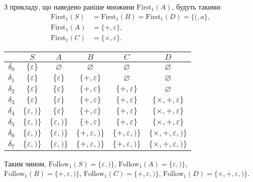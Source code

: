 З прикладу, що наведено раніше множини $\text{First}_1(A)$, будуть такими:
\begin{align*}
\text{First}_1 (S) &= \text{First}_1 (B) = \text{First}_1 (D) = \{(, a\}, \\
\text{First}_1 (A) &= \{+, \varepsilon\}, \\
\text{First}_1 (C) &= \{\times, \varepsilon\}.
\end{align*}

\begin{table}[H]
	\centering
	\begin{tabular}{|c|c|c|c|c|c|}
		\hline
		& $S$ & $A$ & $B$ & $C$ & $D$ \\ \hline
		$\delta_0$ & $\{\varepsilon\}$ & $\varnothing$ & $\varnothing$ & $\varnothing$ & $\varnothing$ \\ \hline
		$\delta_1$ & $\{\varepsilon\}$ & $\{\varepsilon\}$ & $\{+,\varepsilon\}$ & $\varnothing$ & $\varnothing$ \\ \hline
		$\delta_2$ & $\{\varepsilon\}$ & $\{\varepsilon\}$ & $\{+,\varepsilon\}$ & $\{+,\varepsilon\}$ & $\varnothing$ \\ \hline
		$\delta_3$ & $\{\varepsilon\}$ & $\{\varepsilon\}$ & $\{+,\varepsilon\}$ & $\{+,\varepsilon\}$ & $\{\times,+,\varepsilon\}$ \\ \hline
		$\delta_4$ & $\{\varepsilon,)\}$ & $\{\varepsilon\}$ & $\{+,\varepsilon\}$ & $\{+,\varepsilon\}$ & $\{\times,+,\varepsilon\}$ \\ \hline
		$\delta_5$ & $\{\varepsilon,)\}$ & $\{\varepsilon,)\}$ & $\{+,\varepsilon\}$ & $\{+,\varepsilon\}$ & $\{\times,+,\varepsilon\}$ \\ \hline
		$\delta_6$ & $\{\varepsilon,)\}$ & $\{\varepsilon,)\}$ & $\{+,\varepsilon,)\}$ & $\{+,\varepsilon,)\}$ & $\{\times,+,\varepsilon,)\}$ \\ \hline
		$\delta_7$ & $\{\varepsilon,)\}$ & $\{\varepsilon,)\}$ & $\{+,\varepsilon,)\}$ & $\{+,\varepsilon,)\}$ & $\{\times,+,\varepsilon,)\}$ \\ \hline
	\end{tabular}
\end{table}

Таким чином, $\text{Follow}_1 (S) = \{\varepsilon, )\}$, $\text{Follow}_1 (A) = \{\varepsilon, )\}$, $\text{Follow}_1 (B) = \{+,\varepsilon, )\}$, $\text{Follow}_1 (C) = \{+,\varepsilon, )\}$, $\text{Follow}_1 (D) = \{\times,+,\varepsilon, )\}$.

